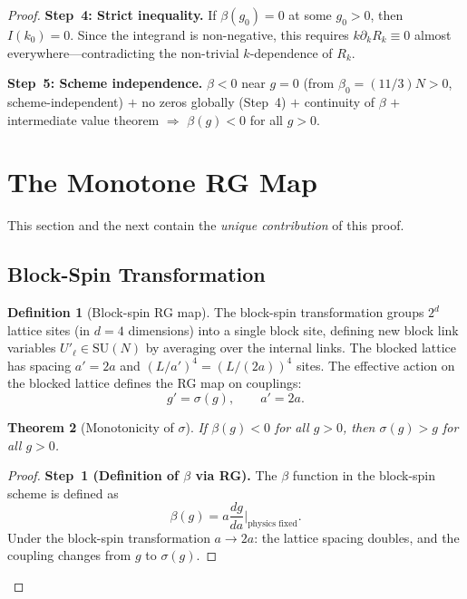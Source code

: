 \documentclass[12pt,a4paper]{article}
\theoremstyle{plain}
\newtheorem{theorem}{Theorem}[section]
\theoremstyle{definition}
\newtheorem{definition}[theorem]{Definition}
\theoremstyle{remark}
\begin{document}
\begin{proof}
\textbf{Step~4: Strict inequality.} If $\beta(g_0)=0$ at some $g_0>0$, then $I(k_0)=0$. Since the integrand is non-negative, this requires $k\partial_kR_k\equiv 0$ almost everywhere---contradicting the non-trivial $k$-dependence of $R_k$.

\textbf{Step~5: Scheme independence.} $\beta<0$ near $g=0$ (from $\beta_0=(11/3)N>0$, scheme-independent) $+$ no zeros globally (Step~4) $+$ continuity of $\beta$ $+$ intermediate value theorem $\Rightarrow$ $\beta(g)<0$ for all $g>0$.

\section{The Monotone RG Map}\label{sec:monotone}

This section and the next contain the \emph{unique contribution} of this proof.

\subsection{Block-Spin Transformation}\label{sec:blockspin}

\begin{definition}[Block-spin RG map]\label{def:blockspin}
The block-spin transformation groups $2^d$ lattice sites (in $d=4$ dimensions) into a single block site, defining new block link variables $U'_\ell\in\mathrm{SU}(N)$ by averaging over the internal links. The blocked lattice has spacing $a'=2a$ and $(L/a')^4=(L/(2a))^4$ sites. The effective action on the blocked lattice defines the RG map on couplings:
\begin{equation}\label{eq:RGmap}
g' = \sigma(g), \qquad a' = 2a.
\end{equation}
\end{definition}

\begin{theorem}[Monotonicity of $\sigma$]\label{thm:monotone}
If $\beta(g)<0$ for all $g>0$, then $\sigma(g)>g$ for all $g>0$.
\end{theorem}

\begin{proof}
\textbf{Step~1 (Definition of $\beta$ via RG).} The $\beta$ function in the block-spin scheme is defined as
\begin{equation}\label{eq:betaRG}
\beta(g) = a\frac{dg}{da}\bigg|_{\text{physics fixed}}.
\end{equation}
Under the block-spin transformation $a\to 2a$: the lattice spacing doubles, and the coupling changes from $g$ to $\sigma(g)$.


\end{proof}
\end{proof}
\end{document}
